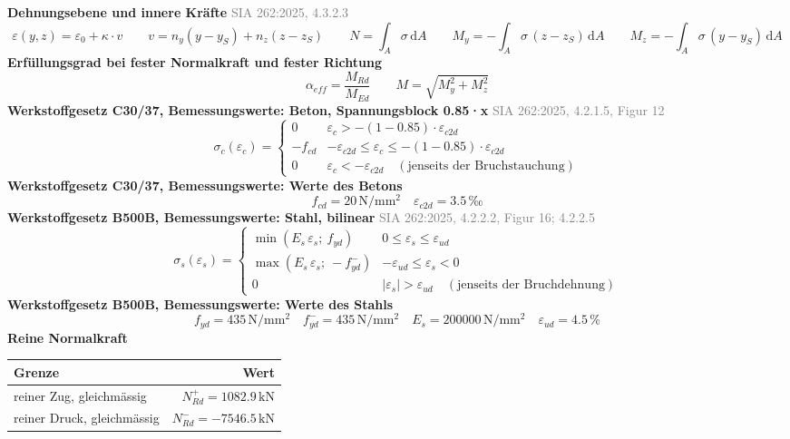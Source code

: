 \documentclass[11pt,a4paper]{article}
\newcommand{\normref}[1]{{\small\textcolor{gray}{#1}}}
\begin{document}
\noindent\textbf{Dehnungsebene und innere Kräfte} \hfill \normref{SIA 262:2025, 4.3.2.3}
\begin{equation*}
\varepsilon(y, z) = \varepsilon_0 + \kappa \cdot v \qquad v = n_y (y - y_S) + n_z (z - z_S) \qquad N = \int_A \sigma\,\mathrm{d}A \qquad M_y = -\int_A \sigma\,(z - z_S)\,\mathrm{d}A \qquad M_z = -\int_A \sigma\,(y - y_S)\,\mathrm{d}A
\end{equation*}
\noindent\textbf{Erfüllungsgrad bei fester Normalkraft und fester Richtung}
\begin{equation*}
\alpha_{eff} = \frac{M_{Rd}}{M_{Ed}} \qquad M = \sqrt{M_y^2 + M_z^2}
\end{equation*}
\noindent\textbf{Werkstoffgesetz C30/37, Bemessungswerte: Beton, Spannungsblock 0.85·x} \hfill \normref{SIA 262:2025, 4.2.1.5, Figur 12}
\begin{equation*}
\sigma_c(\varepsilon_c) = \begin{cases} 0 & \varepsilon_c > -(1 - 0.85) \cdot \varepsilon_{c2d} \\[1ex] -f_{cd} & -\varepsilon_{c2d} \le \varepsilon_c \le -(1 - 0.85) \cdot \varepsilon_{c2d} \\[1ex] 0 & \varepsilon_c < -\varepsilon_{c2d} \quad (\text{jenseits der Bruchstauchung}) \end{cases}
\end{equation*}
\noindent\textbf{Werkstoffgesetz C30/37, Bemessungswerte: Werte des Betons}
\begin{equation*}
f_{cd} = 20\,\mathrm{N}/\mathrm{mm}^{2} \quad \varepsilon_{c2d} = 3.5\,\text{‰}
\end{equation*}
\noindent\textbf{Werkstoffgesetz B500B, Bemessungswerte: Stahl, bilinear} \hfill \normref{SIA 262:2025, 4.2.2.2, Figur 16; 4.2.2.5}
\begin{equation*}
\sigma_s(\varepsilon_s) = \begin{cases} \min(E_s\,\varepsilon_s;\ f_{yd}) & 0 \le \varepsilon_s \le \varepsilon_{ud} \\[1ex] \max(E_s\,\varepsilon_s;\ -f_{yd}^{-}) & -\varepsilon_{ud} \le \varepsilon_s < 0 \\[1ex] 0 & |\varepsilon_s| > \varepsilon_{ud} \quad (\text{jenseits der Bruchdehnung}) \end{cases}
\end{equation*}
\noindent\textbf{Werkstoffgesetz B500B, Bemessungswerte: Werte des Stahls}
\begin{equation*}
f_{yd} = 435\,\mathrm{N}/\mathrm{mm}^{2} \quad f_{yd}^{-} = 435\,\mathrm{N}/\mathrm{mm}^{2} \quad E_s = 200000\,\mathrm{N}/\mathrm{mm}^{2} \quad \varepsilon_{ud} = 4.5\,\%
\end{equation*}
\noindent\textbf{Reine Normalkraft}
\begin{longtable}{lr}
\hline
Grenze & Wert \\
\hline
\endhead
reiner Zug, gleichmässig & $N_{Rd}^{+} = 1082.9\,\mathrm{kN}$ \\
reiner Druck, gleichmässig & $N_{Rd}^{-} = -7546.5\,\mathrm{kN}$ \\
\hline
\end{longtable}
\end{document}
